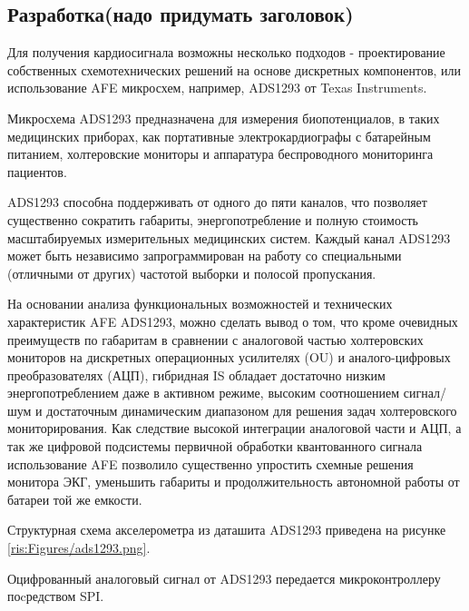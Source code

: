 \subsection{Разработка(надо придумать заголовок)}

Для получения кардиосигнала возможны несколько подходов - проектирование собственных схемотехнических решений на основе дискретных компонентов, или использование \acf{AFE} микросхем, например, ADS1293  от Texas Instruments.

Микросхема ADS1293 предназначена для измерения биопотенциалов, в таких медицинских приборах, как портативные электрокардиографы с батарейным питанием, холтеровские мониторы и аппаратура беспроводного мониторинга пациентов. \cite{ADS1293}

ADS1293 способна поддерживать от одного до пяти каналов, что позволяет существенно сократить габариты, энергопотребление и полную стоимость масштабируемых измерительных медицинских систем. Каждый канал ADS1293 может быть независимо запрограммирован на работу со специальными (отличными от других) частотой выборки и полосой пропускания. 

На основании анализа функциональных возможностей и технических характеристик \ac{AFE} ADS1293, можно сделать вывод о том, что кроме очевидных преимуществ по габаритам в сравнении с аналоговой частью холтеровских мониторов на дискретных операционных усилителях (\acs{OU}) и аналого-цифровых преобразователях (\acs{АЦП}), гибридная \ac{IS} обладает достаточно низким энергопотреблением даже в активном режиме, высоким соотношением сигнал/шум и достаточным динамическим диапазоном для решения задач холтеровского мониторирования. Как следствие высокой интеграции аналоговой части и \ac{АЦП}, а так же цифровой подсистемы первичной обработки квантованного сигнала использование \ac{AFE} позволило существенно упростить схемные решения монитора \acs{ЭКГ}, уменьшить габариты и продолжительность автономной работы от батареи той же емкости. 





Структурная схема акселерометра из даташита ADS1293 \cite{DS1293} приведена на рисунке \ref{ris:Figures/ads1293.png}.


Оцифрованный аналоговый сигнал от ADS1293 передается микроконтроллеру поcредством \acf{SPI}.



